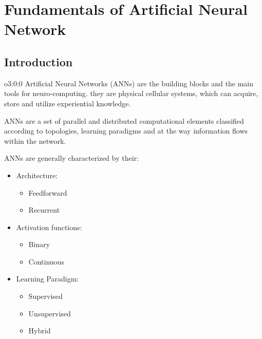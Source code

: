 \documentclass{tron}
\begin{document}
\newpage
\section{Fundamentals of Artificial Neural Network}
\subsection{Introduction}
\begin{overview}[ANNs]{o3:0:0}
	Artiﬁcial Neural Networks (ANNs) are the building blocks and the main tools for neuro-computing. they are physical cellular systems, which can acquire, store and utilize experiential knowledge.
	
	ANNs are a set of parallel and distributed computational elements classiﬁed according to topologies, learning paradigms and at the way information ﬂows within the network.
	
	ANNs are generally characterized by their:
	\vspace{-5pt}
	\begin{itemize}
		\item Architecture:
			\vspace{-5pt}
			\begin{itemize}
				\item Feedforward
				\item Recurrent
			\end{itemize}
		\item Activation functions:
			\vspace{-5pt}
			\begin{itemize}
				\item Binary
				\item Continuous
			\end{itemize}
		\item Learning Paradigm:
			\vspace{-5pt}
			\begin{itemize}
				\item Supervised
				\item Unsupervised
				\item Hybrid
			\end{itemize}
	\end{itemize}	
\end{overview}
\end{document}
